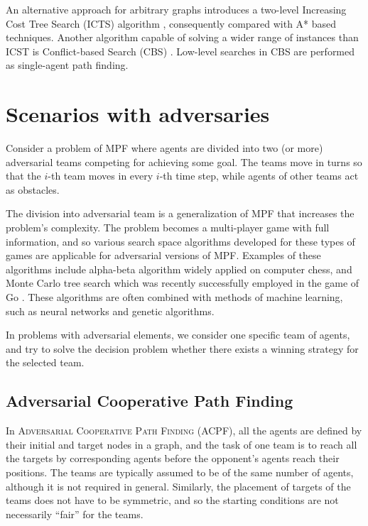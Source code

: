 An alternative approach for arbitrary graphs introduces a two-level Increasing Cost Tree Search (ICTS) algorithm \cite{sharon13}, consequently compared with A* based techniques. 
Another algorithm capable of solving a wider range of instances than ICST is Conflict-based Search (CBS) \cite{sharon13}. 
Low-level searches in CBS are performed as single-agent path finding.
\section{Scenarios with adversaries}

Consider a problem of MPF where agents are divided into two (or more) adversarial teams competing for achieving some goal.
The teams move in turns so that the $i$-th team moves in every $i$-th time step, while agents of other teams act as obstacles.

The division into adversarial team is a generalization of MPF that increases the problem's complexity.
The problem becomes a multi-player game with full information, and so various search space algorithms developed for these types of games are applicable for adversarial versions of MPF.
Examples of these algorithms include alpha-beta algorithm widely applied on computer chess, and Monte Carlo tree search which was recently successfully employed in the game of Go \cite{silver16}.
These algorithms are often combined with methods of machine learning, such as neural networks and genetic algorithms.

In problems with adversarial elements, we consider one specific team of agents, and try to solve the decision problem whether there exists a winning strategy for the selected team. 

\subsection{Adversarial Cooperative Path Finding}

In \textsc{Adversarial Cooperative Path Finding} (ACPF), all the agents are defined by their initial and target nodes in a graph, 
and the task of one team is to reach all the targets by corresponding agents before the opponent's agents reach their positions.
The teams are typically assumed to be of the same number of agents, although it is not required in general.
Similarly, the placement of targets of the teams does not have to be symmetric, and so the starting conditions are not necessarily ``fair'' for the teams.

